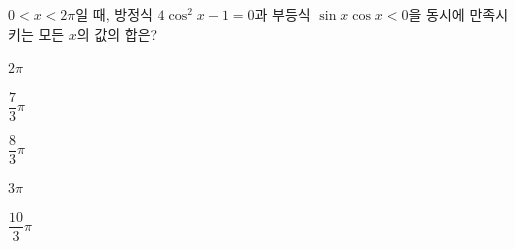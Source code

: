 $0<x<2\pi$일 때, 방정식 $4\cos^2 x-1=0$과 부등식 $\sin x\cos x<0$을 동시에 만족시키는 모든 $x$의 값의 합은?
\begin{choices32}{\rule[-3ex]{0pt}{8ex}$2\pi$}{\rule[-3ex]{0pt}{8ex}$\dfrac{7}{3}\pi$}{\rule[-3ex]{0pt}{8ex}$\dfrac{8}{3}\pi$}{\rule[-3ex]{0pt}{8ex}$3\pi$}{\rule[-3ex]{0pt}{8ex}$\dfrac{10}{3}\pi$}\end{choices32}

